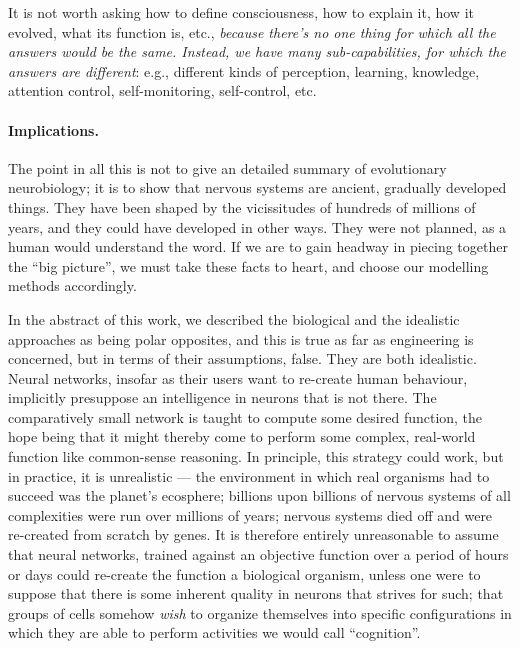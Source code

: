 \begin{emquote}
It is not worth asking how to define consciousness, how to explain it, how it evolved, what its function is, etc., {\em because there's no one thing for which all the answers would be the same. Instead, we have many sub-capabilities, for which the answers are different}: e.g., different kinds of perception, learning, knowledge, attention control, self-monitoring, self-control, etc.
\end{emquote}

\paragraph{Implications.} The point in all this is not to give an detailed summary of evolutionary neurobiology; it is to show that nervous systems are ancient, gradually developed things. They have been shaped by the vicissitudes of hundreds of millions of years, and they could have developed in other ways. They were not planned, as a human would understand the word. If we are to gain headway in piecing together the ``big picture'', we must take these facts to heart, and choose our modelling methods accordingly.

In the abstract of this work, we described the biological and the idealistic approaches as being polar opposites, and this is true as far as engineering is concerned, but in terms of their assumptions, false. They are both idealistic. Neural networks, insofar as their users want to re-create human behaviour, implicitly presuppose an intelligence in neurons that is not there. The comparatively small network is taught to compute some desired function, the hope being that it might thereby come to perform some complex, real-world function like common-sense reasoning. In principle, this strategy could work, but in practice, it is unrealistic --- the environment in which real organisms had to succeed was the planet's ecosphere; billions upon billions of nervous systems of all complexities were run over millions of years; nervous systems died off and were re-created from scratch by genes. It is therefore entirely unreasonable to assume that neural networks, trained against an objective function over a period of hours or days could re-create the function a biological organism, unless one were to suppose that there is some inherent quality in neurons that strives for such; that groups of cells somehow {\em wish} to organize themselves into specific configurations in which they are able to perform activities we would call ``cognition''. 

